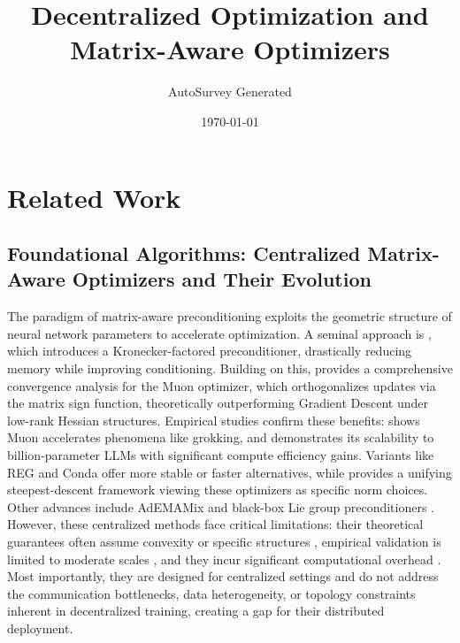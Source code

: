 \documentclass[11pt]{article}
\title{Decentralized Optimization and Matrix-Aware Optimizers}
\author{AutoSurvey Generated}
\date{\today}
\begin{document}
\maketitle

\section{Related Work}

\subsection{Foundational Algorithms: Centralized Matrix-Aware Optimizers and Their Evolution}
The paradigm of matrix-aware preconditioning exploits the geometric structure of neural network parameters to accelerate optimization. A seminal approach is \citet{gupta2018shampoo}, which introduces a Kronecker-factored preconditioner, drastically reducing memory while improving conditioning. Building on this, \citet{shen2025convergence} provides a comprehensive convergence analysis for the Muon optimizer, which orthogonalizes updates via the matrix sign function, theoretically outperforming Gradient Descent under low-rank Hessian structures. Empirical studies confirm these benefits: \citet{tveit2025muon} shows Muon accelerates phenomena like grokking, and \citet{liu2025muon} demonstrates its scalability to billion-parameter LLMs with significant compute efficiency gains. Variants like REG \citep{liu2025reg} and Conda \citep{wang2025conda} offer more stable or faster alternatives, while \citet{bernstein2024old} provides a unifying steepest-descent framework viewing these optimizers as specific norm choices. Other advances include AdEMAMix \citep{Pagliardini2024TheAO} and black-box Lie group preconditioners \citep{Li2022BlackBL}. However, these centralized methods face critical limitations: their theoretical guarantees often assume convexity or specific structures \citep{shen2025convergence, neymeyr2012geometric}, empirical validation is limited to moderate scales \citep{abreu2025potential, wang2025muon}, and they incur significant computational overhead \citep{chen2025AME}. Most importantly, they are designed for centralized settings and do not address the communication bottlenecks, data heterogeneity, or topology constraints inherent in decentralized training, creating a gap for their distributed deployment.
\end{document}

